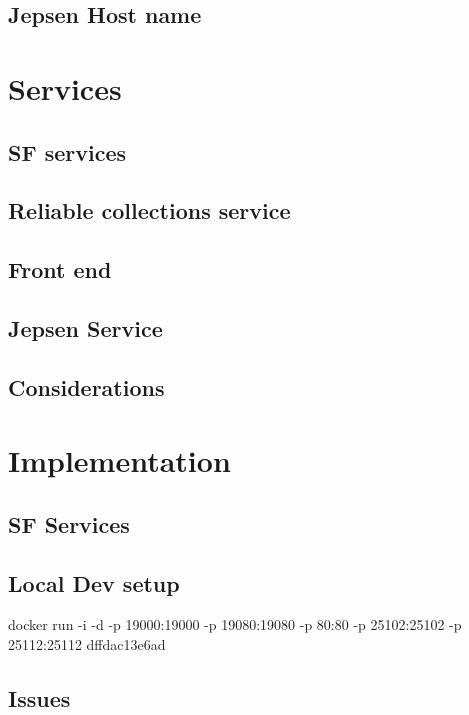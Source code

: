 \documentclass[a4paper,10pt,titlepage]{report}
\begin{document}
\subsection{Jepsen Host name}

\section{Services}

\subsection{SF services}


\subsection{Reliable collections service}

\subsection{Front end}


\subsection{Jepsen Service}

\subsection{Considerations}


\section{Implementation}

\subsection{SF Services}

\subsection{Local Dev setup}

docker run -i -d -p 19000:19000 -p 19080:19080 -p 80:80 -p 25102:25102 -p 25112:25112 dffdac13e6ad



\subsection{Issues}
\end{document}
